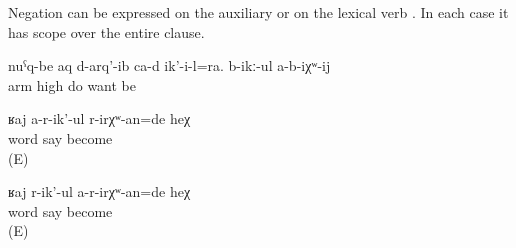 Negation can be expressed on the auxiliary  or on the lexical verb . In each case it has scope over the entire clause.
%
\begin{exe}
	\ex	\label{ex:He also raised his arms; he probably does not want to (be taken away)}
	\gll	nuˁq-be	aq d-arq'-ib ca-d	ik'-i-l=ra.	b-ikː-ul		a-b-iχʷ-ij\\
		arm	high do 		want	be\\
	\glt	{}

	\ex	\label{ex:‎Probably she was not scolding reprise}
	\begin{xlist}
		\ex	\label{ex:‎Probably she was not scolding@A}
		\gll	ʁaj	a-r-ik'-ul	r-irχʷ-an=de	heχ\\
			word	say	become	\\
		\glt	{} (E)
	
		\ex	\label{ex:‎Probably she was not scolding@B}
		\gll	ʁaj	r-ik'-ul	a-r-irχʷ-an=de	heχ\\
			word	say	become	\\
		\glt	{} (E)
	\end{xlist}
\end{exe}

